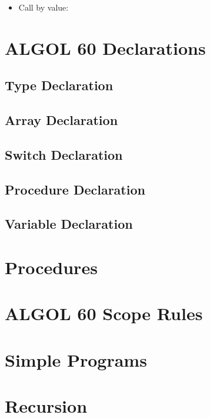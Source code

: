 \documentclass{article}
\begin{document}
\begin{itemize}
	\item Call by value:
\end{itemize}

\newpage

\section{ALGOL 60 Declarations}

\subsection{Type Declaration} \label{typeDecl}

\subsection{Array Declaration} \label{arrayDecl}

\subsection{Switch Declaration} \label{switchDecl}

\subsection{Procedure Declaration} \label{procDecl}

\subsection{Variable Declaration}

\newpage

\section{Procedures}

\newpage

\section{ALGOL 60 Scope Rules} \label{scopeRule}

\newpage

\section{Simple Programs}

\newpage

\section{Recursion}
\end{document}
